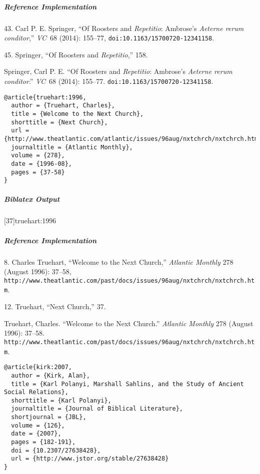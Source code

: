 \documentclass[a4paper]{article}
\newenvironment{biboutput}{%
  \subparagraph{Biblatex Output}
}{\color{black}}
\newenvironment{refimp}{%
  \subparagraph{Reference Implementation}
  \color{reference-colour}
  \rm
}{\par\color{black}}
\begin{document}
\begin{refimp}
  \hspace*{\bibindent}43. Carl P. E. Springer, “Of Roosters and
  \emph{Repetitio}: Ambrose’s \emph{Aeterne rerum conditor},” \emph{VC}~68
  (2014): 155–77, \nolinkurl{doi:10.1163/15700720-12341158}.

  \hspace*{\bibindent}45. Springer, “Of Roosters and \emph{Repetitio},” 158.

  \hangindent\bibindent Springer, Carl P. E. “Of Roosters and
  \emph{Repetitio}: Ambrose’s \emph{Aeterne rerum conditor}.” \emph{VC}~68
  (2014): 155–77. \nolinkurl{doi:10.1163/15700720-12341158}.

\end{refimp}

\begin{lstlisting}
@article{truehart:1996,
  author = {Truehart, Charles},
  title = {Welcome to the Next Church},
  shorttitle = {Next Church},
  url = {http://www.theatlantic.com/atlantic/issues/96aug/nxtchrch/nxtchrch.htm},
  journaltitle = {Atlantic Monthly},
  volume = {278},
  date = {1996-08},
  pages = {37-58}
}
\end{lstlisting}

\begin{biboutput}
  [37]{truehart:1996}
\end{biboutput}

\begin{refimp}
  \hspace*{\bibindent}8. Charles Truehart, “Welcome to the Next Church,”
  \emph{Atlantic Monthly} 278 (August 1996): 37–58,
  \nolinkurl{http://www.theatlantic.com/past/docs/issues/96aug/nxtchrch/nxtchrch.htm}.

  \hspace*{\bibindent}12. Truehart, “Next Church,” 37.
 
  \sloppy\hangindent\bibindent Truehart, Charles. “Welcome to the Next Church.”
  \emph{Atlantic Monthly} 278 (August 1996): 37–58.
  \nolinkurl{http://www.theatlantic.com/past/docs/issues/96aug/nxtchrch/nxtchrch.htm}.
\end{refimp}

\begin{lstlisting}
@article{kirk:2007,
  author = {Kirk, Alan},
  title = {Karl Polanyi, Marshall Sahlins, and the Study of Ancient Social Relations},
  shorttitle = {Karl Polanyi},
  journaltitle = {Journal of Biblical Literature},
  shortjournal = {JBL},
  volume = {126},
  date = {2007},
  pages = {182-191},
  doi = {10.2307/27638428},
  url = {http://www.jstor.org/stable/27638428}
}
\end{lstlisting}
\end{document}
